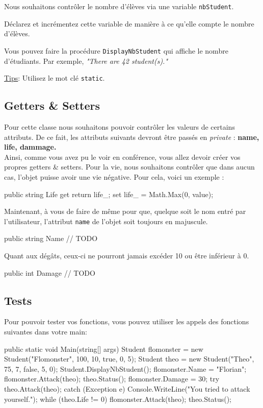 Nous souhaitons contrôler le nombre d'élèves via une variable \texttt{nbStudent}.

Déclarez et incrémentez cette variable de manière à ce qu'elle compte le nombre d'élèves.

Vous pouvez faire la procédure \texttt{DisplayNbStudent} qui affiche le nombre d'étudiants. Par exemple, \textit{"There are 42 student(s)."}

\underline{Tips}: Utilisez le mot clé \texttt{static}.

\subsection{Getters \& Setters}

Pour cette classe nous souhaitons pouvoir contrôler les valeurs de certains attributs. 
De ce fait, les attributs suivants devront être passés en \emph{private} : \textbf{name, life, dammage.}\\
Ainsi, comme vous avez pu le voir en conférence, vous allez devoir créer vos propres getters \& setters. Pour la vie, nous souhaitons contrôler que dans aucun cas, l'objet puisse avoir une vie négative. Pour cela, voici un exemple :

\begin{code}
public string Life
{
	get { return life_; }
	set { life_ = Math.Max(0, value); }
}
\end{code}

Maintenant, à vous de faire de même pour que, quelque soit le nom entré par l'utilisateur, l'attribut \texttt{name} de l'objet soit toujours en majuscule. 

\begin{code}
public string Name
{
	// TODO
}
\end{code}

Quant aux dégâts, ceux-ci ne pourront jamais excéder 10 ou être inférieur à 0.
\begin{code}
public int Damage
{
	// TODO
}
\end{code}

\subsection{Tests}

Pour pouvoir tester vos fonctions, vous pouvez utiliser les appels des fonctions suivantes dans votre main:

\begin{code}
public static void Main(string[] args)
{
    Student flomonster = new Student("Flomonster", 100, 10, true, 0, 5);
    Student theo = new Student("Theo", 75, 7, false, 5, 0);
    Student.DisplayNbStudent();
    flomonster.Name = "Florian";
    flomonster.Attack(theo);
    theo.Status();
    flomonster.Damage = 30;
    try
    {
    	theo.Attack(theo);
    }
    catch (Exception e)
    {
    	Console.WriteLine("You tried to attack yourself.");
    }
    while (theo.Life != 0)
    {
        flomonster.Attack(theo);
		theo.Status();
	}
}
\end{code}

